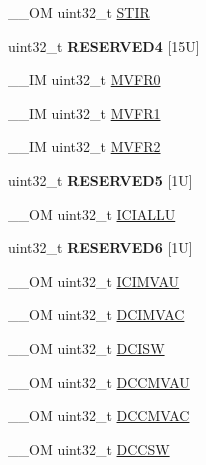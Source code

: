 \begin{DoxyCompactItemize}
\item 
\+\_\+\+\_\+\+OM uint32\+\_\+t \mbox{\hyperlink{struct_s_c_b___type_ada9cbba14ab1cc3fddd585f870932db8}{S\+T\+IR}}
\item 
\mbox{\label{struct_s_c_b___type_a0711ee752d54c93f03410a3a57181e07}} 
uint32\+\_\+t {\bfseries R\+E\+S\+E\+R\+V\+E\+D4} \mbox{[}15\+U\mbox{]}
\item 
\+\_\+\+\_\+\+IM uint32\+\_\+t \mbox{\hyperlink{struct_s_c_b___type_a9b0103b438c8922eaea5624f71afbbc8}{M\+V\+F\+R0}}
\item 
\+\_\+\+\_\+\+IM uint32\+\_\+t \mbox{\hyperlink{struct_s_c_b___type_a0a610dc4212de3ce1ad62e9afa76c728}{M\+V\+F\+R1}}
\item 
\+\_\+\+\_\+\+IM uint32\+\_\+t \mbox{\hyperlink{struct_s_c_b___type_a8353348c9336aa1aadcbf86b6f0f18c9}{M\+V\+F\+R2}}
\item 
\mbox{\label{struct_s_c_b___type_a171526446695fcdbfaf7992e567f881d}} 
uint32\+\_\+t {\bfseries R\+E\+S\+E\+R\+V\+E\+D5} \mbox{[}1\+U\mbox{]}
\item 
\+\_\+\+\_\+\+OM uint32\+\_\+t \mbox{\hyperlink{struct_s_c_b___type_a011024c365e7c5bd13a63830af60b10c}{I\+C\+I\+A\+L\+LU}}
\item 
\mbox{\label{struct_s_c_b___type_a5009eeafbfdd33771613e8f36c4e6a34}} 
uint32\+\_\+t {\bfseries R\+E\+S\+E\+R\+V\+E\+D6} \mbox{[}1\+U\mbox{]}
\item 
\+\_\+\+\_\+\+OM uint32\+\_\+t \mbox{\hyperlink{struct_s_c_b___type_a1a8ecda7b1e4a1100dd82fc694bb4eb5}{I\+C\+I\+M\+V\+AU}}
\item 
\+\_\+\+\_\+\+OM uint32\+\_\+t \mbox{\hyperlink{struct_s_c_b___type_a72402d657f9e448afce57bbd8577864d}{D\+C\+I\+M\+V\+AC}}
\item 
\+\_\+\+\_\+\+OM uint32\+\_\+t \mbox{\hyperlink{struct_s_c_b___type_aca1ec746911b0934dd11c31d93a369be}{D\+C\+I\+SW}}
\item 
\+\_\+\+\_\+\+OM uint32\+\_\+t \mbox{\hyperlink{struct_s_c_b___type_a9d4029e220311690756d836948e71393}{D\+C\+C\+M\+V\+AU}}
\item 
\+\_\+\+\_\+\+OM uint32\+\_\+t \mbox{\hyperlink{struct_s_c_b___type_acc23dc74d8f0378d81bc72302e325e50}{D\+C\+C\+M\+V\+AC}}
\item 
\+\_\+\+\_\+\+OM uint32\+\_\+t \mbox{\hyperlink{struct_s_c_b___type_a2bf149d6d8f4fa59e25aee340512cb79}{D\+C\+C\+SW}}
\item 

\end{DoxyCompactItemize}
